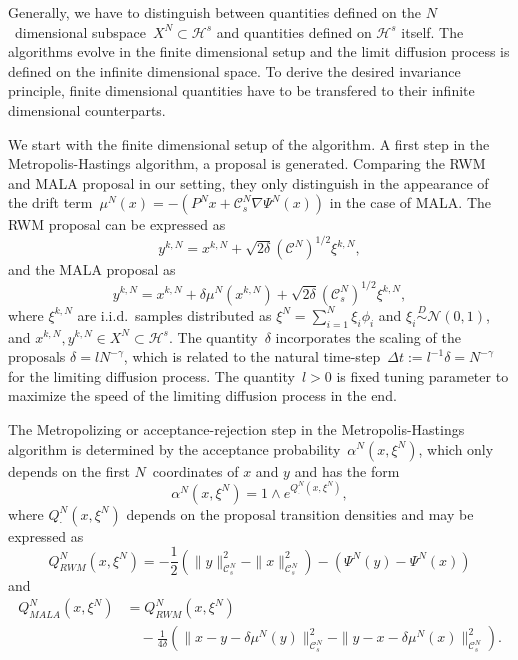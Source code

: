 Generally, we have to distinguish between quantities defined on the $N$~dimensional subspace~$X^N \subset \mathcal{H}^s$ and quantities defined on $\mathcal{H}^s$ itself. The algorithms evolve in the finite dimensional setup and the limit diffusion process is defined on the infinite dimensional space. To derive the desired invariance principle, finite dimensional quantities have to be transfered to their infinite dimensional counterparts.

We start with the finite dimensional setup of the algorithm. A first step in the Metropolis-Hastings algorithm, a proposal is generated. Comparing the RWM and MALA proposal in our setting, they only distinguish in the appearance of the drift term~$\mu^{N}(x) = - (P^{N}x + \mathcal{C}_s^{N} \nabla \Psi^{N}(x))$ in the case of MALA. The RWM proposal can be expressed as
\begin{equation}
\label{DLR-RWM-proposal short}
 y^{k,N} = x^{k,N} + \sqrt{2 \delta} (\mathcal{C}^{N})^{1/2} \xi^{k,N},
\end{equation}
and the MALA proposal as
\begin{equation}
\label{DLR- MALA-proposal short}
 y^{k,N} = x^{k,N} + \delta \mu^{N}(x^{k,N}) + \sqrt{2 \delta} (\mathcal{C}_s^{N})^{1/2} \xi^{k,N},
\end{equation}
where $\xi^{k,N}$ are i.i.d.\, samples distributed as $\xi^{N} = \sum_{i=1}^{N} \xi_i \phi_i$ and $\xi_i \stackrel{D}{\sim} \mathcal{N}(0,1)$, and $x^{k,N}, y^{k,N} \in X^{N} \subset \mathcal{H}^s$. The quantity~$\delta$  incorporates the scaling of the proposals $ \delta = l N^{-\gamma} $, which is related to the natural time-step~$\Delta t := l^{-1} \delta = N^{ - \gamma}$ for the limiting diffusion process. The quantity~$l > 0$ is fixed tuning parameter to maximize the speed of the limiting diffusion process in the end.

The Metropolizing or acceptance-rejection step in the Metropolis-Hastings algorithm is determined by the acceptance probability~$\alpha^{N}(x, \xi^{N})$, which only depends on the first $N$~coordinates of $x$ and $y$ and has the form
\begin{equation}
 \label{DLR-acceptance probability short}
 \alpha^{N} (x, \xi^{N}) = 1 \wedge e^{Q^{N}_{\cdot}(x, \xi^{N})},
\end{equation}
where $Q^{N}_{\cdot}(x, \xi^{N})$ depends on the proposal transition densities and may be expressed as
\begin{equation}
 \label{DLR-Q RWM short}
 Q_{RWM}^{N}(x, \xi^{N}) = - \frac{1}{2} \left(\| y \|_{\mathcal{C}_s^N}^2 - \| x \|_{\mathcal{C}_s^N}^2\right) - \left( \Psi^N(y) - \Psi^N(x) \right)
\end{equation}
and 
\begin{equation}
 \label{DLR-Q MALA short}
 \begin{split}
  Q_{MALA}^{N}(x, \xi^{N}) & = Q_{RWM}^{N}(x, \xi^{N}) \\
  & \quad - \frac{1}{4 \delta} \left( \| x - y - \delta \mu^N(y) \|_{\mathcal{C}_s^N}^2 -  \| y - x - \delta \mu^N(x) \|_{\mathcal{C}_s^N}^2 \right).
 \end{split}
\end{equation}

